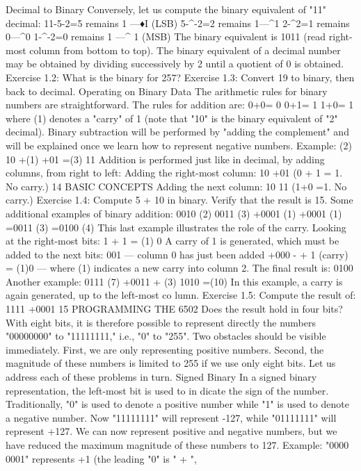 \documentclass{book}
\begin{document}
Decimal to Binary
Conversely, let us compute the binary equivalent of "11" decimal:
11-5-2=5 remains 1 —♦I (LSB)
5-^-2=2 remains 1—^1
2-^2=1 remains 0—^0
1-^-2=0 remains 1 —^ 1 (MSB)
The binary equivalent is 1011 (read right-most column from bottom
to top).
The binary equivalent of a decimal number may be obtained by dividing
successively by 2 until a quotient of 0 is obtained.
Exercise 1.2: What is the binary for 257?
Exercise 1.3: Convert 19 to binary, then back to decimal.
Operating on Binary Data
The arithmetic rules for binary numbers are straightforward. The rules
for addition are:
0+0= 0
0+1= 1
1+0= 1
where (1) denotes a "carry" of 1 (note that "10" is the binary equivalent
of "2" decimal). Binary subtraction will be performed by "adding the
complement" and will be explained once we learn how to represent
negative numbers.
Example:
(2) 10
+(1) +01
=(3) 11
Addition is performed just like in decimal, by adding columns, from
right to left:
Adding the right-most column:
10
+01
(0 + 1 = 1. No carry.)
14
BASIC CONCEPTS
Adding the next column:
10
11 (1+0 =1. No carry.)
Exercise 1.4: Compute 5 + 10 in binary. Verify that the result is 15.
Some additional examples of binary addition:
0010 (2) 0011 (3)
+0001 (1) +0001 (1)
=0011 (3) =0100 (4)
This last example illustrates the role of the carry.
Looking at the right-most bits: 1 + 1 = (1) 0
A carry of 1 is generated, which must be added to the next bits:
001 — column 0 has just been added
+000 -
+ 1 (carry)
= (1)0 — where (1) indicates a new
carry into column 2.
The final result is: 0100
Another example:
0111 (7)
+0011 + (3)
1010 =(10)
In this example, a carry is again generated, up to the left-most co
lumn.
Exercise 1.5: Compute the result of:
1111
+0001
15
PROGRAMMING THE 6502
Does the result hold in four bits?
With eight bits, it is therefore possible to represent directly the
numbers "00000000" to "11111111," i.e., "0" to "255". Two
obstacles should be visible immediately. First, we are only
representing positive numbers. Second, the magnitude of these
numbers is limited to 255 if we use only eight bits. Let us address
each of these problems in turn.
Signed Binary
In a signed binary representation, the left-most bit is used to in
dicate the sign of the number. Traditionally, "0" is used to denote
a positive number while "1" is used to denote a negative number.
Now "11111111" will represent -127, while "01111111" will
represent +127. We can now represent positive and negative
numbers, but we have reduced the maximum magnitude of these
numbers to 127.
Example: "0000 0001" represents +1 (the leading "0" is " + ",
\end{document}
